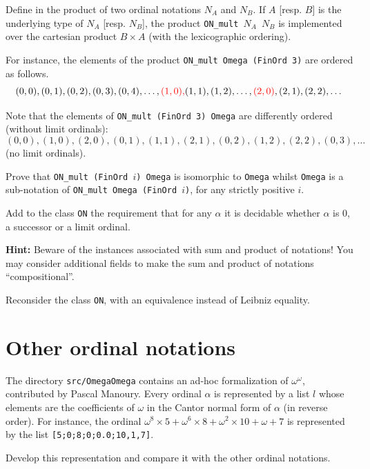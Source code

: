 \documentclass[a4paper]{book}
\begin{document}
\label{exo:ON-mult}
\begin{project}
Define in \coq{} the product of two ordinal notations $N_A$ and $N_B$.
If $A$ [resp. $B$] is the underlying type of $N_A$ [resp. $N_B$], the
product \texttt{ON\_mult $N_A$ $N_B$} is implemented over the cartesian product $B\times A$ (with the lexicographic ordering).

For instance, the
elements of the product \texttt{ON\_mult Omega (FinOrd 3)} are ordered as follows.
\[(0,0),(0,1),(0,2),(0,3),(0,4),\dots,{\color{red}(1,0),} (1,1),(1,2),\dots, {\color{red}(2,0)},(2,1),(2,2),\dots\]

Note that the elements of  \texttt{ON\_mult (FinOrd 3) Omega} are differently ordered (without limit ordinals):
\[(0,0),(1,0),(2,0),(0,1),(1,1),(2,1),(0,2),(1,2),(2,2),(0,3),\dots\]
(no limit ordinals).

Prove that \texttt{ON\_mult (FinOrd $i$) Omega} is isomorphic to
\texttt{Omega}  whilst
\texttt{Omega}  is a sub-notation of \texttt{ON\_mult Omega (FinOrd $i$)},
for any strictly positive $i$.
\end{project}

\begin{project}
\label{project:succ-limit-dec}
Add to the class \texttt{ON} the requirement that for any $\alpha$ it is decidable whether $\alpha$ is $0$, a successor or a limit ordinal.


\textbf{Hint:}   Beware of the instances associated with sum and product of notations!
  You may consider additional fields 
to make the sum and product of notations ``compositional''.

\end{project}

\begin{project}
\label{project:on-setoid}
Reconsider the  class \texttt{ON}, with an equivalence instead of Leibniz equality.
\end{project}






\section{Other ordinal notations}


\begin{project}
The directory \texttt{src/OmegaOmega} contains an ad-hoc formalization of $\omega^\omega$, contributed by Pascal Manoury. Every ordinal $\alpha$ is represented by a list $l$ whose elements are the coefficients of $\omega$ in  the Cantor normal form of $\alpha$ (in reverse order). For instance, the ordinal 
$\omega^{8}\times 5 + \omega^{6}\times 8 + \omega^2\times 10 + \omega + 7$ is represented by the list \texttt{[5;0;8;0;0.0;10,1,7]}. 


 Develop this representation and compare it with the other ordinal notations.



\end{project}
\end{document}
